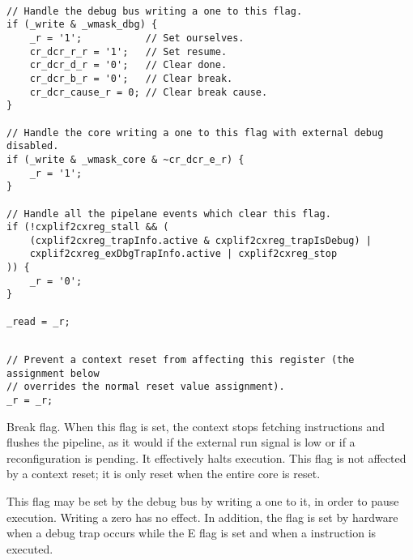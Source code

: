 \declaration{}
\implementation{}
\begin{lstlisting}

// Handle the debug bus writing a one to this flag.
if (_write & _wmask_dbg) {
    _r = '1';           // Set ourselves.
    cr_dcr_r_r = '1';   // Set resume.
    cr_dcr_d_r = '0';   // Clear done.
    cr_dcr_b_r = '0';   // Clear break.
    cr_dcr_cause_r = 0; // Clear break cause.
}

// Handle the core writing a one to this flag with external debug disabled.
if (_write & _wmask_core & ~cr_dcr_e_r) {
    _r = '1';
}

// Handle all the pipelane events which clear this flag.
if (!cxplif2cxreg_stall && (
    (cxplif2cxreg_trapInfo.active & cxplif2cxreg_trapIsDebug) |
    cxplif2cxreg_exDbgTrapInfo.active | cxplif2cxreg_stop
)) {
    _r = '0';
}

_read = _r;
\end{lstlisting}
\resetImplementation{}
\begin{lstlisting}

// Prevent a context reset from affecting this register (the assignment below
// overrides the normal reset value assignment).
_r = _r;

\end{lstlisting}

Break flag. When this flag is set, the context stops fetching instructions and
flushes the pipeline, as it would if the external run signal is low or if a
reconfiguration is pending. It effectively halts execution. This flag is not 
affected by a context reset; it is only reset when the entire core is reset.

This flag may be set by the debug bus by writing a one to it, in order to pause
execution. Writing a zero has no effect. In addition, the flag is set by
hardware when a debug trap occurs while the E flag is set and when a 
instruction is executed.


